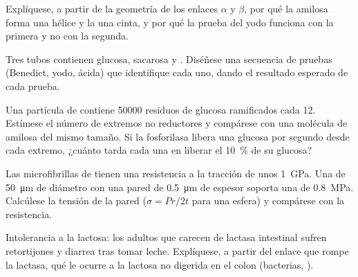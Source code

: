 \begin{exercise}[$\star\star$]\label{exo:b1:carbohydrates:5}
Explíquese, a partir de la geometría de los enlaces $\alpha$ y $\beta$, por
qué la amilosa forma una hélice y la  una cinta, y por qué la prueba
del yodo funciona con la primera y no con la segunda.
\end{exercise}

\begin{exercise}[$\star\star$]\label{exo:b1:carbohydrates:6}
Tres tubos contienen glucosa, sacarosa y . Diséñese una secuencia de
pruebas (Benedict, yodo,  ácida) que identifique cada uno, dando
el resultado esperado de cada prueba.
\end{exercise}

\begin{exercise}[$\star\star$]\label{exo:b1:carbohydrates:7}
Una partícula de  contiene \num{50000} residuos de glucosa
ramificados cada 12. Estímese el número de extremos no reductores y
compárese con una molécula de amilosa del mismo tamaño. Si la fosforilasa
libera una glucosa por segundo desde cada extremo, ¿cuánto tarda cada una en
liberar el \qty{10}{\%} de su glucosa?
\end{exercise}

\begin{exercise}[$\star\star$]\label{exo:b1:carbohydrates:8}
Las microfibrillas de  tienen una resistencia a la tracción de unos
\qty{1}{GPa}. Una  de \qty{50}{\micro m} de diámetro con una pared de
\qty{0.5}{\micro m} de espesor soporta una  de \qty{0.8}{MPa}.
Calcúlese la tensión de la pared ($\sigma = Pr/2t$ para una esfera) y
compárese con la resistencia.
\end{exercise}

\begin{exercise}[$\star\star$]\label{exo:b1:carbohydrates:9}
Intolerancia a la lactosa: los adultos que carecen de lactasa intestinal
sufren retortijones y diarrea tras tomar leche. Explíquese, a partir del
enlace que rompe la lactasa, qué le ocurre a la lactosa no digerida en el
colon (bacterias, ).
\end{exercise}

